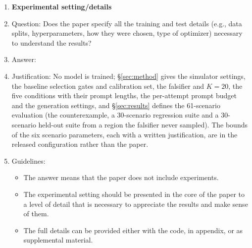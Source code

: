 \begin{enumerate}
\item {\bf Experimental setting/details}
    \item[] Question: Does the paper specify all the training and test details (e.g., data splits, hyperparameters, how they were chosen, type of optimizer) necessary to understand the results?
    \item[] Answer: \answerYes{}
    \item[] Justification: No model is trained; \S\ref{sec:method} gives the simulator settings, the baseline selection gates and calibration set, the falsifier and $K{=}20$, the five conditions with their prompt lengths, the per-attempt prompt budget and the generation settings, and \S\ref{sec:results} defines the 61-scenario evaluation (the counterexample, a 30-scenario regression suite and a 30-scenario held-out suite from a region the falsifier never sampled). The bounds of the six scenario parameters, each with a written justification, are in the released configuration rather than the paper.
    \item[] Guidelines:
    \begin{itemize}
        \item The answer \answerNA{} means that the paper does not include experiments.
        \item The experimental setting should be presented in the core of the paper to a level of detail that is necessary to appreciate the results and make sense of them.
        \item The full details can be provided either with the code, in appendix, or as supplemental material.
    \end{itemize}


\end{enumerate}
